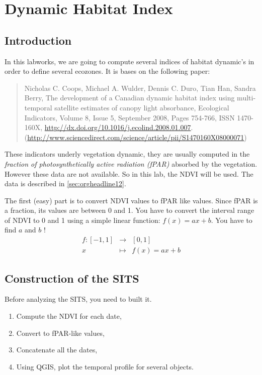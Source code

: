 \documentclass[a4paper,11pt,DIV=18]{scrartcl}
\begin{document}
\section{Dynamic Habitat Index}
\label{sec:orgheadline37}
\subsection{Introduction}
\label{sec:orgheadline33}
In this labworks, we are going to compute several indices of habitat
dynamic's in order to define several ecozones. It is bases on the
following paper: 

\begin{quote}
Nicholas C. Coops, Michael A. Wulder, Dennis C. Duro, Tian Han, Sandra
Berry,  The development  of  a Canadian  dynamic  habitat index  using
multi-temporal  satellite   estimates  of  canopy   light  absorbance,
Ecological  Indicators,  Volume  8,  Issue 5,  September  2008,  Pages
754-766,                        ISSN                        1470-160X,
\url{http://dx.doi.org/10.1016/j.ecolind.2008.01.007}.
(\url{http://www.sciencedirect.com/science/article/pii/S1470160X08000071})
\end{quote}

These indicators underly vegetation dynamic, they are usually computed
in the \emph{fraction of photosynthetically active radiation (fPAR)} absorbed
by the vegetation.  However these data  are not available.  So in this
lab, the NDVI will be used. The data is described in \ref{sec:orgheadline12}.


\begin{work}
The first (easy)  part is to convert NDVI values  to fPAR like values.
Since fPAR is a fraction, its values  are between 0 and 1. You have to
convert the interval  range of NDVI to  0 and 1 using  a simple linear
function: \(f(x)=ax+b\). You have to find \(a\) and \(b\) !
\begin{eqnarray*}
  f:[-1,1] &\to& [0,1]\\
  x&\mapsto&f(x)=ax+b
\end{eqnarray*}
\end{work}

\subsection{Construction of the SITS}
\label{sec:orgheadline34}
Before analyzing the  SITS, you need to built it.   
\begin{work}
\begin{enumerate}
\item Compute the NDVI for each date,
\item Convert to fPAR-like values,
\item Concatenate all the dates,
\item Using QGIS, plot the temporal profile for several objects.
\end{enumerate}
\end{work}
\end{document}
